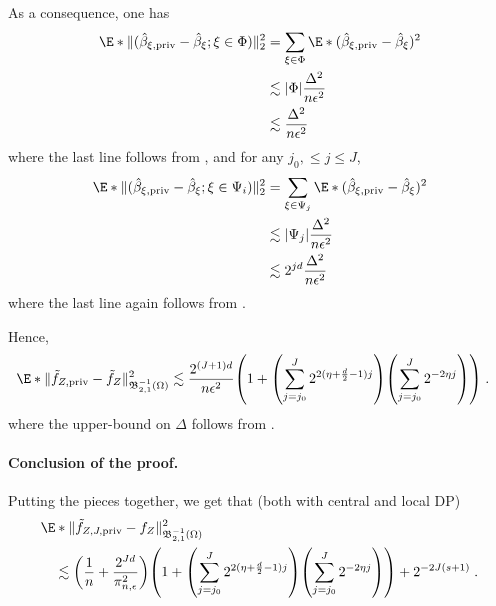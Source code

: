 \documentclass{article}
\newcommand{\1}{\mathds{1}}
\DeclarePairedDelimiter{\paren}{\lparen}{\rparen}
\theoremstyle{plain}
\theoremstyle{definition}
\theoremstyle{remark}
\begin{document}
As a consequence, one has
\begin{equation}
    \begin{aligned}
        \E*{\| (\hat{\beta}_{\xi, \textrm{priv}} - \hat{\beta}_{\xi};  \xi \in \Phi) \|_2^2}
        &= \sum_{\xi \in \Phi} \E*{(\hat{\beta}_{\xi, \textrm{priv}} - \hat{\beta}_{\xi})^2} \\
        &\lesssim |\Phi| \frac{\Delta^2}{n \epsilon^2} \\
        &\lesssim \frac{\Delta^2}{n \epsilon^2}
    \end{aligned}
\end{equation}
where the last line follows from , and for any $j_0, \leq j \leq J$,
\begin{equation}
    \begin{aligned}
        \E*{\| (\hat{\beta}_{\xi, \textrm{priv}} - \hat{\beta}_{\xi};  \xi \in \Psi_i) \|_2^2}
        &= \sum_{\xi \in \Psi_j} \E*{(\hat{\beta}_{\xi, \textrm{priv}} - \hat{\beta}_{\xi})^2} \\
        &\lesssim |\Psi_j| \frac{\Delta^2}{n \epsilon^2} \\
        &\lesssim 2^{j d} \frac{\Delta^2}{n \epsilon^2}
    \end{aligned}
\end{equation}
where the last line again follows from .

Hence,
\begin{equation}
\begin{aligned}
    \E*{\| \tilde{f}_{Z, \textrm{priv}} - \tilde{f}_{Z}\|_{{\mathfrak{B}}_{2, 1}^{-1}(\Omega)}^2} 
    &\lesssim
    \frac{2^{(J+1)d}}{n \epsilon^2} \paren*{1 
    + \paren*{\sum_{j = j_0}^J 2^{2 (\eta + \frac{d}{2} - 1)j} }
    \paren*{\sum_{j = j_0}^J 2^{-2 \eta j} }} \;.
\end{aligned}
\end{equation}
where the upper-bound on $\Delta$ follows from . 

\paragraph{Conclusion of the proof.}

Putting the pieces together, we get that (both with central and local DP)
\begin{equation}
    \begin{aligned}
        &\E*{\| \tilde{f}_{Z,J, \textrm{priv}} - f_Z\|_{{\mathfrak{B}}_{2, 1}^{-1}(\Omega)}^2} \\
        &\quad \lesssim 
        \paren*{\frac{1}{n} + \frac{2^{Jd}}{\pi_{n,\epsilon}^2}} \paren*{1 
    + \paren*{\sum_{j = j_0}^J 2^{2 (\eta + \frac{d}{2} - 1)j} }
    \paren*{\sum_{j = j_0}^J 2^{-2 \eta j} }}
    + 2^{-2J(s+1)} \;.
    \end{aligned}
\end{equation}
\end{document}
